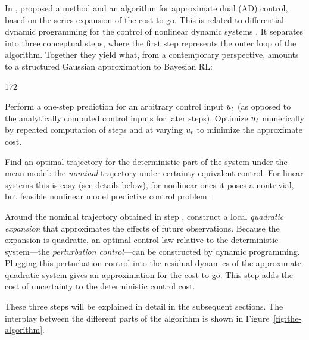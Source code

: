 In \citeyear{Tse.Bar-Shalom.ea:1973:Wide-sense},
\citeauthor{Tse.Bar-Shalom.ea:1973:Wide-sense} proposed a method
\cite{Tse.Bar-Shalom.ea:1973:Wide-sense} and an
algorithm \cite{Tse.Bar-Shalom:1973:Actively} for approximate dual (AD) control,
based on the series expansion of the cost-to-go. This is related to differential
dynamic programming for the control of nonlinear dynamic systems
\cite{Mayne:1966:Second-order}. It separates into three conceptual steps, where
the first step represents the outer loop of the algorithm. Together they
yield what, from a contemporary perspective, amounts to a structured
Gaussian approximation to Bayesian RL:
\begin{dingautolist}{172}
\item Perform a one-step prediction for an arbitrary control input $u_t$ (as
  opposed to the analytically computed control inputs for later steps). Optimize
  $u_t$ numerically by repeated computation of steps  and 
  at varying $u_t$ to minimize the approximate cost.
\item Find an optimal trajectory for the deterministic part of the system under
  the mean model: the \emph{nominal} trajectory under certainty equivalent
  control. For linear systems this is easy (see details below), for nonlinear
  ones it poses a nontrivial, but feasible nonlinear model predictive control
  problem
  .
\item Around the nominal trajectory obtained in step , construct a
  local \emph{quadratic expansion} that approximates the effects of future
  observations. Because the expansion is quadratic, an optimal control law
  relative to the deterministic system---the \emph{perturbation control}---can
  be constructed by dynamic programming. Plugging this perturbation control into
  the residual dynamics of the approximate quadratic system gives an
  approximation for the cost-to-go. This step adds the cost of uncertainty to
  the deterministic control cost.
\end{dingautolist}
These three steps will be explained in detail in the subsequent sections.
The interplay between the different parts of the algorithm is shown in
Figure~\ref{fig:the-algorithm}.

\begin{figure*}
  \begin{center}
  \end{center}
  \caption[Flowchart of the approximate dual control algorithm.]{Flowchart of
the approximate dual control algorithm to show the overall structure. Adapted
from . The left cycle is the outer loop
of the algorithm, performing the nonlinear optimization.}
  \label{fig:the-algorithm}
\end{figure*}

